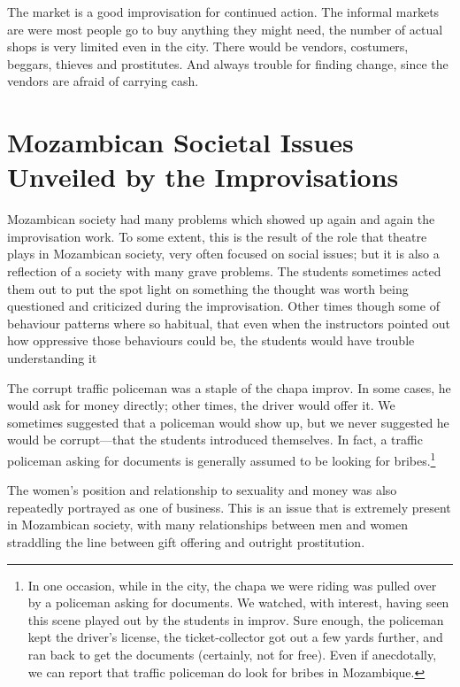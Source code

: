 \documentclass[article,twocolumn,twoside]{memoir}
\begin{document}
The market is a good improvisation for continued action. The informal markets
are were most people go to buy anything they might need, the number of actual
shops is very limited even in the city. There would be vendors, costumers,
beggars, thieves and prostitutes. And always trouble for finding change, since
the vendors are afraid of carrying cash.

\section{Mozambican Societal Issues Unveiled by the Improvisations}

Mozambican society had many problems which showed up again and again the
improvisation work. To some extent, this is the result of the role that theatre
plays in Mozambican society, very often focused on social issues; but it is
also a reflection of a society with many grave problems. The students sometimes
acted them out to put the spot light on something the thought was worth being
questioned and criticized during the improvisation. Other times though some of
behaviour patterns where so habitual, that even when the instructors pointed
out how oppressive those behaviours could be, the students would have trouble
understanding it

The corrupt traffic policeman was a staple of the chapa improv. In some cases,
he would ask for money directly; other times, the driver would offer it. We
sometimes suggested that a policeman would show up, but we never suggested he
would be corrupt---that the students introduced themselves. In fact, a traffic
policeman asking for documents is generally assumed to be looking for
bribes.\footnote{In one occasion, while in the city, the chapa we were riding
was pulled over by a policeman asking for documents. We watched, with interest,
having seen this scene played out by the students in improv. Sure enough, the
policeman kept the driver's license, the ticket-collector got out a few yards
further, and ran back to get the documents (certainly, not for free). Even if
anecdotally, we can report that traffic policeman do look for bribes in
Mozambique.}

The women's position and relationship to sexuality and money was also
repeatedly portrayed as one of business. This is an issue that is extremely
present in Mozambican society, with many relationships between men and women
straddling the line between gift offering and outright prostitution.
\end{document}
